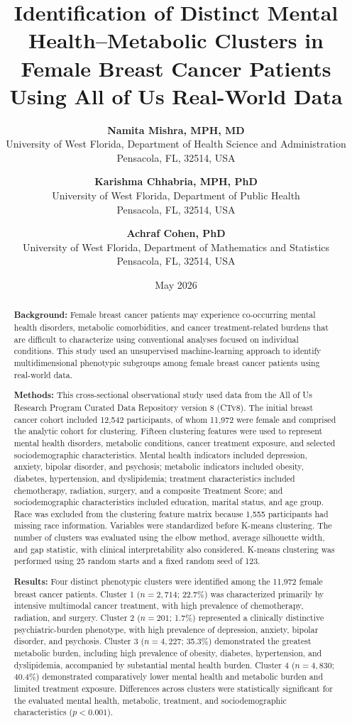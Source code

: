 \documentclass[11pt]{article}
\title{
\textbf{Identification of Distinct Mental Health--Metabolic Clusters in Female Breast Cancer Patients Using All of Us Real-World Data}
}
\author{
\textbf{Namita Mishra, MPH, MD}\\
University of West Florida, Department of Health Science and Administration\\
Pensacola, FL, 32514, USA
\and
\textbf{Karishma Chhabria, MPH, PhD}\\
University of West Florida, Department of Public Health\\
Pensacola, FL, 32514, USA
\and
\textbf{Achraf Cohen, PhD}\\
University of West Florida, Department of Mathematics and Statistics\\
Pensacola, FL, 32514, USA
}
\date{May 2026}
\begin{document}
\maketitle

\begin{abstract}

\textbf{Background:} Female breast cancer patients may experience co-occurring
mental health disorders, metabolic comorbidities, and cancer treatment-related
burdens that are difficult to characterize using conventional analyses focused
on individual conditions. This study used an unsupervised machine-learning
approach to identify multidimensional phenotypic subgroups among female breast
cancer patients using real-world data.

\textbf{Methods:} This cross-sectional observational study used data from the
All of Us Research Program Curated Data Repository version 8 (CTv8). The
initial breast cancer cohort included 12,542 participants, of whom 11,972 were
female and comprised the analytic cohort for clustering. Fifteen clustering
features were used to represent mental health disorders, metabolic conditions,
cancer treatment exposure, and selected sociodemographic characteristics.
Mental health indicators included depression, anxiety, bipolar disorder, and
psychosis; metabolic indicators included obesity, diabetes, hypertension, and
dyslipidemia; treatment characteristics included chemotherapy, radiation,
surgery, and a composite Treatment Score; and sociodemographic characteristics
included education, marital status, and age group. Race was excluded from the
clustering feature matrix because 1,555 participants had missing race
information. Variables were standardized before K-means clustering. The number
of clusters was evaluated using the elbow method, average silhouette width,
and gap statistic, with clinical interpretability also considered. K-means
clustering was performed using 25 random starts and a fixed random seed of 123.

\textbf{Results:} Four distinct phenotypic clusters were identified among the
11,972 female breast cancer patients. Cluster 1 ($n=2,714$; 22.7\%) was
characterized primarily by intensive multimodal cancer treatment, with high
prevalence of chemotherapy, radiation, and surgery. Cluster 2 ($n=201$; 1.7\%)
represented a clinically distinctive psychiatric-burden phenotype, with high
prevalence of depression, anxiety, bipolar disorder, and psychosis. Cluster 3
($n=4,227$; 35.3\%) demonstrated the greatest metabolic burden, including high
prevalence of obesity, diabetes, hypertension, and dyslipidemia, accompanied by
substantial mental health burden. Cluster 4 ($n=4,830$; 40.4\%) demonstrated
comparatively lower mental health and metabolic burden and limited treatment
exposure. Differences across clusters were statistically significant for the
evaluated mental health, metabolic, treatment, and sociodemographic
characteristics ($p<0.001$).


\end{abstract}
\end{document}
